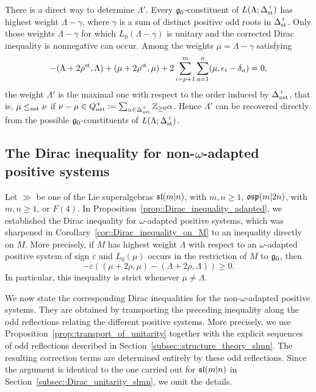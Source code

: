 \begin{remark}\label{rmk::determination_Lambda'}
There is a direct way to determine $\Lambda'$. Every $\even$-constituent of
$L(\Lambda;\Delta_{\st}^{+})$ has highest weight $\Lambda-\gamma$, where
$\gamma$ is a sum of distinct positive odd roots in $\Delta_{\st}^{+}$.
Only those weights $\Lambda-\gamma$ for which $L_0(\Lambda-\gamma)$ is
unitary and the corrected Dirac inequality is nonnegative can occur.
Among the weights $\mu=\Lambda-\gamma$ satisfying
\[
-(\Lambda+2\rho^{\st},\Lambda)
+(\mu+2\rho^{\st},\mu)
+2\sum_{i=p+1}^{m}\sum_{a=1}^{n}
(\mu,\epsilon_i-\delta_a)
=0,
\]
the weight $\Lambda'$ is the maximal one with respect to the order induced by
$\Delta_{\nst}^{+}$, that is, $\mu\leq_{\nst}\nu$ if
$\nu-\mu\in Q_{\nst}^{+}\coloneqq \sum_{\alpha \in \Delta_{\nst}^{+}}\ZZ_{\geq 0}\alpha$. Hence $\Lambda'$ can be recovered directly from
the possible $\even$-constituents of $L(\Lambda;\Delta_{\st}^{+})$.
\end{remark}

\subsection{The Dirac inequality for non-\texorpdfstring{$\omega$}{}-adapted positive systems}\label{subsec::corrected_Dirac}

Let $\gg$ be one of the Lie superalgebras $\sl(m\vert n)$, with
$m,n\geq1$, $\osp(m\vert 2n)$, with $m,n\geq1$, or $F(4)$.
In Proposition~\ref{prop::Dirac_inequality_adapted}, we established the
Dirac inequality for $\omega$-adapted positive systems, which was sharpened
in Corollary~\ref{cor::Dirac_inequality_on_M} to an inequality directly on
$M$. More precisely, if $M$ has highest weight $\Lambda$ with respect to
an $\omega$-adapted positive system of sign $\varepsilon$ and
$L_{0}(\mu)$ occurs in the restriction of $M$ to $\even$, then
\begin{equation}
-\varepsilon
\left(
(\mu+2\rho,\mu)
-
(\Lambda+2\rho,\Lambda)
\right)
\geq0.
\end{equation}
In particular, this inequality is strict whenever $\mu \neq \Lambda$. 

We now state the corresponding Dirac inequalities for the
non-$\omega$-adapted positive systems. They are obtained by transporting
the preceding inequality along the odd reflections relating the different
positive systems. More precisely, we use
Proposition~\ref{prop::transport_of_unitarity} together with the explicit
sequences of odd reflections described in
Section~\ref{subsec::structure_theory_slmn}. The resulting correction
terms are determined entirely by these odd reflections. Since the
argument is identical to the one carried out for $\slmn$ in
Section~\ref{subsec::Dirac_unitarity_slmn}, we omit the details.

